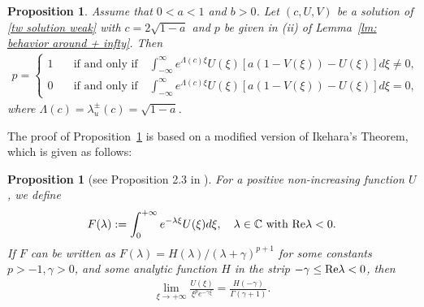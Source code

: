 \documentclass[11pt,a4paper]{article}
\newtheorem{proposition}[theorem]{\textbf{Proposition}}
\numberwithin{equation}{section}
\numberwithin{figure}{section}
\newcommand\dps{\displaystyle}
\newcommand\bea{\begin{eqnarray}}
\newcommand\eea{\end{eqnarray}}
\begin{document}
\begin{proposition}\label{prop: implicit cond}
Assume that $0<a<1$ and $b>0$.
Let $(c,U,V)$ be a solution of \eqref{tw solution weak} with
$c=2\sqrt{1-a}$ and
$p$ be given in (ii) of Lemma~\ref{lm: behavior around + infty}.
Then
\bea\label{cond-p}
 p=
\begin{cases}
1 & \quad \mbox{if and only if}\quad  \int_{-\infty}^{\infty}e^{\Lambda(c)\xi}U(\xi)[a(1-V(\xi))-U(\xi)]d\xi\neq0,\\
0 & \quad \mbox{if and only if}\quad  \int_{-\infty}^{\infty}e^{\Lambda(c)\xi}U(\xi)[a(1-V(\xi))-U(\xi)]d\xi=0,
\end{cases}
\eea
where $\Lambda(c)=\lambda_u^{\pm}(c)=\sqrt{1-a}$.
\end{proposition}


The proof of Proposition~\ref{prop: implicit cond} is based on
a modified version of Ikehara's Theorem, which is given as follows:

\begin{proposition}[see Proposition 2.3 in \cite{Carr Chmaj}]\label{prop:ikehara}
For a positive non-increasing function $U$, we define
\begin{eqnarray*}
\dps F(\lambda):=\int_0^{+\infty} e^{-\lambda\xi} U(\xi) d\xi,\quad
\mbox{$\lambda\in\mathbb{C}$ with ${\rm Re}\lambda<0$}.
\end{eqnarray*}
If $F$ can be written as
$F(\lambda)={H(\lambda)}/{(\lambda+\gamma)^{p+1}}$
for some constants $p>-1, \gamma>0$, and some analytic function $H$
in the strip $-\gamma\leq {\rm Re}\lambda<0$, then
\begin{eqnarray*}
\lim_{\xi\rightarrow +\infty}
\frac{U(\xi)}{{\xi}^{p}e^{-\gamma\xi}}=\frac{H(-\gamma)}{\Gamma(\gamma+1)}.
\end{eqnarray*}
\end{proposition}
\end{document}
